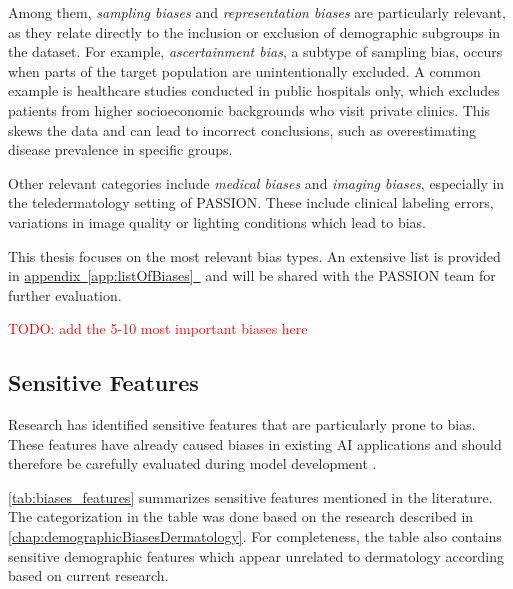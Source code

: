 \documentclass[12pt, a4paper, oneside]{book}   	%
\renewcommand{\todo}[1]{\textcolor{red}{TODO: #1}}
\newcommand{\linkapp}[1]{\hyperref[#1]{appendix~\ref{#1}~\nameref{#1}}}
\begin{document}
			Among them, \textit{sampling biases} and \textit{representation biases} are particularly relevant, as they relate directly to the inclusion or exclusion of demographic subgroups in the dataset. For example, \textit{ascertainment bias}, a subtype of sampling bias, occurs when parts of the target population are unintentionally excluded. A common example is healthcare studies conducted in public hospitals only, which excludes patients from higher socioeconomic backgrounds who visit private clinics. This skews the data and can lead to incorrect conclusions, such as overestimating disease prevalence in specific groups.
			
			Other relevant categories include \textit{medical biases} and \textit{imaging biases}, especially in the teledermatology setting of PASSION. These include clinical labeling errors, variations in image quality or lighting conditions which lead to bias.
			
			
			This thesis focuses on the most relevant bias types. An extensive list is provided in \linkapp{app:listOfBiases} and will be shared with the PASSION team for further evaluation.
			
			\todo{add the 5-10 most important biases here}
			
			\subsection{Sensitive Features}
			Research has identified sensitive features that are particularly prone to bias. These features have already caused biases in existing \gls{AI} applications and should therefore be carefully evaluated during model development \autocite{Mehrabi_2021}.
			
			\autoref{tab:biases_features} summarizes sensitive features mentioned in the literature. The categorization in the table was done based on the research described in \autoref{chap:demographicBiasesDermatology}. For completeness, the table also contains sensitive demographic features which appear unrelated to dermatology according based on current research.
			

			
\end{document}
